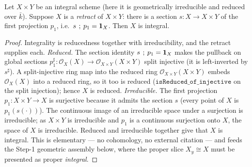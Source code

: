 \begin{lemma}
  \label{lem:isIntegral_of_retract_of_integral}
  Let \(X \times Y\) be an integral scheme (here it is geometrically irreducible and reduced over
  \(\bar k\)). Suppose \(X\) is a \emph{retract} of \(X \times Y\): there is a section
  \(s \colon X \to X \times Y\) of the first projection \(p_1\), i.e.\ \(s \fatsemi p_1 = \mathbf 1_X\).
  Then \(X\) is integral.
\end{lemma}
\begin{proof}
\leanok
  Integrality is reducedness together with irreducibility, and the retract supplies each.
  \emph{Reduced.} The section identity \(s \fatsemi p_1 = \mathbf 1_X\) makes the pullback on global
  sections \(p_1^\sharp \colon \mathcal O_X(X) \to \mathcal O_{X \times Y}(X \times Y)\) split
  injective (it is left-inverted by \(s^\sharp\)). A split-injective ring map into the reduced ring
  \(\mathcal O_{X \times Y}(X \times Y)\) embeds \(\mathcal O_X(X)\) into a reduced ring, so it too is
  reduced (\(\mathtt{isReduced\_of\_injective}\) on the split injection); hence \(X\) is reduced.
  \emph{Irreducible.} The first projection \(p_1 \colon X \times Y \to X\) is surjective because it
  admits the section \(s\) (every point of \(X\) is \(p_1(s(\cdot))\)). The continuous image of an
  irreducible space under a surjection is irreducible; as \(X \times Y\) is irreducible and \(p_1\) is a
  continuous surjection onto \(X\), the space of \(X\) is irreducible.
  Reduced and irreducible together give that \(X\) is integral. This is elementary --- no cohomology,
  no external citation --- and feeds the Step-1 geometric assembly below, where the proper slice
  \(X_y \cong X\) must be presented as proper \emph{integral}.
\end{proof}
